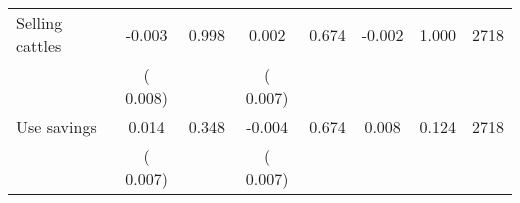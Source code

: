 \begin{tabular}{l*{7}{c}}
 Selling cattles       &             -0.003       &        0.998  &              0.002       &        0.674  &             -0.002       &              1.000 &  2718 \\ 
                       &       (       0.008)             &                               &       (       0.007)                     &                               &                                               &                                &                      \\ 

 Use savings       &              0.014       &        0.348  &             -0.004       &        0.674  &              0.008       &              0.124 &  2718 \\ 
                       &       (       0.007)             &                               &       (       0.007)                     &                               &                                               &                                &                      \\ 

\hline \end{tabular}